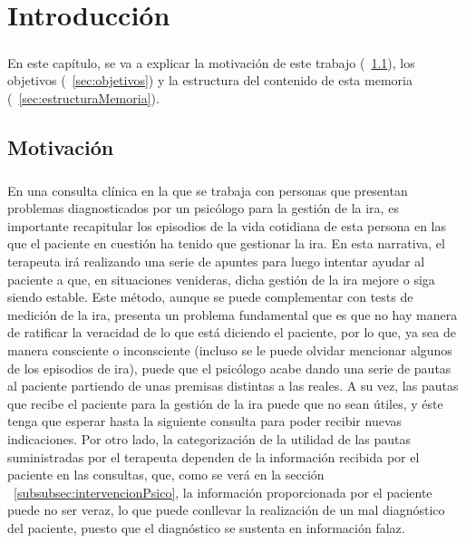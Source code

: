 %
%

\chapter{Introducción}

\paragraph{}
En este capítulo, se va a explicar la motivación de este trabajo (~\ref{sec:motivacion}), los objetivos (~\ref{sec:objetivos}) y la estructura del contenido de esta memoria (~\ref{sec:estructuraMemoria}).

\section{Motivación}
\label{sec:motivacion}
\paragraph{}
En una consulta clínica en la que se trabaja con personas que presentan problemas diagnosticados por un psicólogo para la gestión de la ira, es importante recapitular los episodios de la vida cotidiana de esta persona en las que el paciente en cuestión ha tenido que gestionar la ira. En esta narrativa, el terapeuta irá realizando una serie de apuntes para luego intentar ayudar al paciente a que, en situaciones venideras, dicha gestión de la ira mejore o siga siendo estable. Este método, aunque se puede complementar con tests de medición de la ira, presenta un problema fundamental que es que no hay manera de ratificar la veracidad de lo que está diciendo el paciente, por lo que, ya sea de manera consciente o inconsciente (incluso se le puede olvidar mencionar algunos de los episodios de ira), puede que el psicólogo acabe dando una serie de pautas al paciente partiendo de unas premisas distintas a las reales. A su vez, las pautas que recibe el paciente para la gestión de la ira puede que no sean útiles, y éste tenga que esperar hasta la siguiente consulta para poder recibir nuevas indicaciones. Por otro lado, la categorización de la utilidad de las pautas suministradas por el terapeuta dependen de la información recibida por el paciente en las consultas, que, como se verá en la sección ~\ref{subsubsec:intervencionPsico}, la información proporcionada por el paciente puede no ser veraz, lo que puede conllevar la realización de un mal diagnóstico del paciente, puesto que el diagnóstico se sustenta en información falaz.

